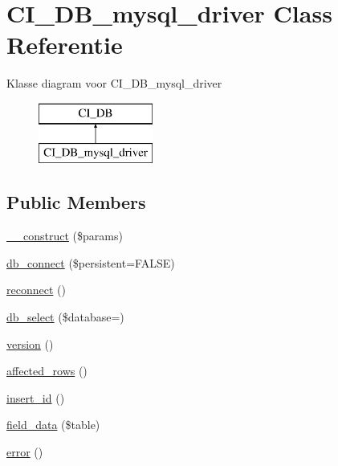 \hypertarget{class_c_i___d_b__mysql__driver}{}\section{C\+I\+\_\+\+D\+B\+\_\+mysql\+\_\+driver Class Referentie}
\label{class_c_i___d_b__mysql__driver}
Klasse diagram voor C\+I\+\_\+\+D\+B\+\_\+mysql\+\_\+driver\begin{figure}[H]
\begin{center}
\leavevmode
\includegraphics[height=2.000000cm]{class_c_i___d_b__mysql__driver}
\end{center}
\end{figure}
\subsection*{Public Members}
\begin{DoxyCompactItemize}
\item 
\mbox{\hyperlink{class_c_i___d_b__mysql__driver_a9162320adff1a1a4afd7f2372f753a3e}{\+\_\+\+\_\+construct}} (\$params)
\item 
\mbox{\hyperlink{class_c_i___d_b__mysql__driver_a52bf595e79e96cc0a7c907a9b45aeb4d}{db\+\_\+connect}} (\$persistent=F\+A\+L\+SE)
\item 
\mbox{\hyperlink{class_c_i___d_b__mysql__driver_a57c19c642ab3023e28d10c50f86ff0a8}{reconnect}} ()
\item 
\mbox{\hyperlink{class_c_i___d_b__mysql__driver_a18ae9c21870b30b45337c5e3626190cc}{db\+\_\+select}} (\$database=\textquotesingle{}\textquotesingle{})
\item 
\mbox{\hyperlink{class_c_i___d_b__mysql__driver_a6080dae0886626b9a4cedb29240708b1}{version}} ()
\item 
\mbox{\hyperlink{class_c_i___d_b__mysql__driver_a77248aaad33eb132c04cc4aa3f4bc8cb}{affected\+\_\+rows}} ()
\item 
\mbox{\hyperlink{class_c_i___d_b__mysql__driver_a933f2cde8dc7f87875e257d0a4902e99}{insert\+\_\+id}} ()
\item 
\mbox{\hyperlink{class_c_i___d_b__mysql__driver_a90355121e1ed009e0efdbd544ab56efa}{field\+\_\+data}} (\$table)
\item 
\mbox{\hyperlink{class_c_i___d_b__mysql__driver_a43b8d30b879d4f09ceb059b02af2bc02}{error}} ()
\end{DoxyCompactItemize}
